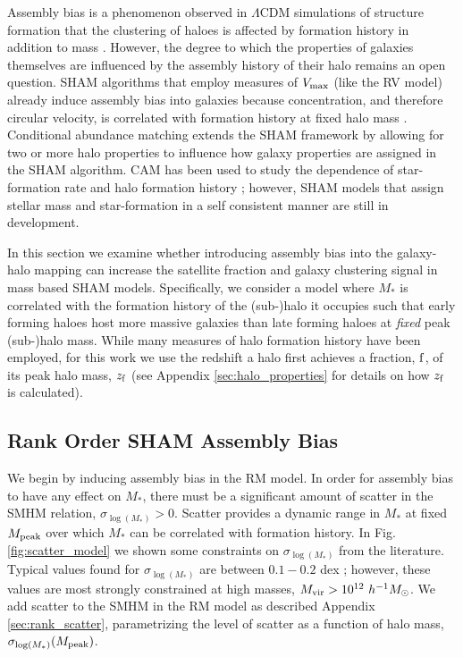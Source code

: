 \documentclass[a4paper,fleqn,usenatbib]{mnras}
\begin{document}
Assembly bias is a phenomenon observed in $\Lambda$CDM simulations of structure formation that the clustering of haloes is affected by formation history in addition to mass \citep{Gao:2005ds, Wechsler:2006rg, Gao:2007yy, li:2008oi, Sunayama:2015ue}.  However, the degree to which the properties of galaxies themselves are influenced by the assembly history of their halo remains an open question.  SHAM algorithms that employ measures of $V_{\rm max}$ (like the RV model) already induce assembly bias into galaxies because concentration, and therefore circular velocity, is correlated with formation history at fixed halo mass \citep{Zentner:2014ki}.  Conditional abundance matching \citep[CAM,][]{Hearin:2014hh} extends the SHAM framework by allowing for two or more halo properties to influence how galaxy properties are assigned in the SHAM algorithm.  CAM has been used to study the dependence of star-formation rate and halo formation history \citep{Hearin:2013km, Hearin:2014hh, Watson:2015gq, Saito:2015vi, Paranjape:2015uy}; however, SHAM models that assign stellar mass and star-formation in a self consistent manner are still in development.

In this section we examine whether introducing assembly bias into the galaxy-halo mapping can increase the satellite fraction and galaxy clustering signal in mass based SHAM models.  Specifically, we consider a model where $M_{*}$ is correlated with the formation history of the (sub-)halo it occupies such that early forming haloes host more massive galaxies than late forming haloes at {\em fixed} peak (sub-)halo mass.  While many measures of halo formation history have been employed, for this work we use the redshift a halo first achieves a fraction, $\rm f$, of its peak halo mass, $z_{\rm f}$ (see Appendix \ref{sec:halo_properties} for details on how $z_{\rm f}$ is calculated).


\subsection{Rank Order SHAM Assembly Bias}

We begin by inducing assembly bias in the RM model.  In order for assembly bias to have any effect on $M_*$, there must be a significant amount of scatter in the SMHM relation, $\sigma_{\log(M_*)} >0$.  Scatter provides a dynamic range in $M_*$ at fixed $M_{\rm peak}$ over which $M_*$ can be correlated with formation history.  In Fig. \ref{fig:scatter_model} we shown some constraints on $\sigma_{\log(M_*)}$  from the literature.   Typical values found for $\sigma_{\log(M_*)}$ are between $0.1-0.2$ dex \citep{More:2011il, Reddick:2013gi, Zu:2015vh, Tinker:2016vu}; however, these values are most strongly constrained at high masses, $M_{\rm vir}>10^{12}~h^{-1}M_{\odot}$.  We add scatter to the SMHM in the RM model as described Appendix \ref{sec:rank_scatter}, parametrizing the level of scatter as a function of halo mass, $\sigma_{\log(M_*)}(M_{\rm peak})$.   
\end{document}
